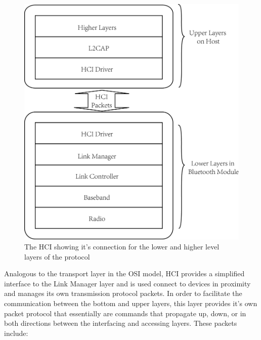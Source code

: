 \documentclass[a4paper,12pt]{article}
\begin{document}
\begin{figure}[h!]
\centering
\hspace*{2cm}\includegraphics[scale=.7]{Figures/Figure4.png}
\caption{The HCI showing it's connection for the lower and higher level layers of the protocol}
\label{fig:HCILayer}
\end{figure}

Analogous to the transport layer in the OSI model, HCI provides a simplified interface to the Link Manager layer and is used connect to devices in proximity and manages its own transmission protocol packets. In order to facilitate the communication between the bottom and upper layers, this layer provides it’s own packet protocol that essentially are commands that propagate up, down, or in both directions between the interfacing and accessing layers. These packets include:
\end{document}
